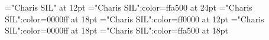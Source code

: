\documentclass[a4paper]{article}
\begin{document}
\pagestyle{plain}
\sloppy
\setlength{\parfillskip}{0pt plus 1fil}
\font\main="Charis SIL" at 12pt
\font\abcmain="Charis SIL":color=ffa500 at 24pt
\font\amain="Charis SIL":color=0000ff at 18pt
\font\bmain="Charis SIL":color=ff0000 at 12pt
\font\abenmain="Charis SIL":color=0000ff at 18pt
\font\acmain="Charis SIL":color=ffa500 at 18pt

\pagestyle{fancy} 






\end{document}
